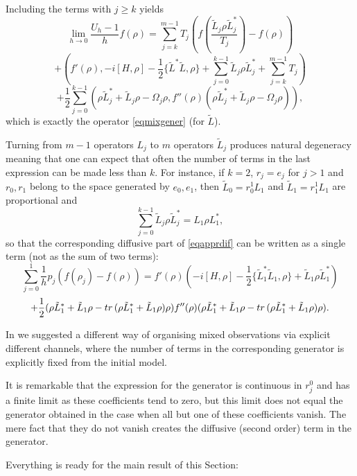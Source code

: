 \documentclass[10pt,a4paper]{amsart}
\def\tr{\rm{tr}}
\newcommand{\Om}{\Omega}
\begin{document}
Including the terms with $j\ge k$ yields
\[
\lim_{h\to 0} \frac{U_h-1}{h} f(\rho)=\sum_{j=k}^{m-1} T_j \left(f(\frac{\tilde L_j \rho \tilde L_j^*}{T_j})-f(\rho)\right)
\]
\[
+\left(f'(\rho), -i[H, \rho] -\frac12 \{\tilde L^*\tilde L,\rho\}
+\sum_{j=0}^{k-1}\tilde L_j \rho \tilde L_j^*
+\sum_{j=k}^{m-1} T_j\right)
\]
\begin{equation}
\label{eqapprdif}
+\frac12 \sum_{j=0}^{k-1}  \left(\rho \tilde L_j^* + \tilde L_j\rho-\Om_j \rho,
f''(\rho)  (\rho \tilde L_j^* + \tilde L_j\rho-\Om_j \rho)\right),
\end{equation}
which is exactly the operator \eqref{eqmixgener} (for $\tilde L$).

Turning from $m-1$ operators $L_j$
to $m$ operators $\tilde L_j$ produces natural degeneracy meaning
that one can expect that often the number of terms in the last expression
can be made less than $k$. For instance, if $k=2$, $r_j=e_j$ for $j>1$ and $r_0,r_1$ belong to the
space generated by $e_0,e_1$, then $\tilde L_0=r_0^1 L_1$ and $\tilde L_1=r^1_1 L_1$
are proportional and
\[
\sum_{j=0}^{k-1} \tilde L_j \rho \tilde L_j^*=L_1\rho L_1^*,
\]
so that the corresponding diffusive part of \eqref{eqapprdif}
can be written as a single term (not as the sum of two terms):
\[
\sum_{j=0}^1 \frac{1}{h} p_j (f(\rho_j)-f(\rho))
=f'(\rho) \left(-i[H, \rho] -\frac12 \{\tilde L_1^*\tilde L_1,\rho\} +\tilde L_1 \rho \tilde L_1^* \right)
\]
\[
+\frac12 (\rho \tilde L_1^* + \tilde L_1\rho-{\tr} \, (\rho \tilde L_1^* +\tilde L_1 \rho) \rho) f''(\rho)
 (\rho \tilde L_1^* + \tilde L_1\rho-{\tr}\, (\rho \tilde L_1^* +\tilde L_1 \rho)  \rho).
\]

In \cite{KolQuantFrac} we suggested a different way of organising mixed observations via
explicit different channels, where the number of terms in the corresponding generator
is explicitly fixed from the initial model.

It is remarkable that the expression for the generator is continuous
in $r_j^0$ and has a finite limit as these coefficients
tend to zero, but this limit does not equal the generator
obtained in the case when all but one of these coefficients vanish.
The mere fact that they do not vanish creates the diffusive (second order) term in the generator.

Everything is ready for the main result of this Section:
\end{document}
